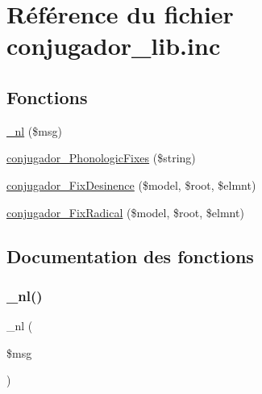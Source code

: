 \hypertarget{conjugador__lib_8inc}{}\section{Référence du fichier conjugador\+\_\+lib.\+inc}
\label{conjugador__lib_8inc}
\subsection*{Fonctions}
\begin{DoxyCompactItemize}
\item 
\hyperlink{conjugador__lib_8inc_af8d770de4c75689bba7f9764be4d6c80}{\+\_\+nl} (\$msg)
\item 
\hyperlink{conjugador__lib_8inc_a672ae0386cba05339c0708b743535c7a}{conjugador\+\_\+\+Phonologic\+Fixes} (\$string)
\item 
\hyperlink{conjugador__lib_8inc_a725ad05277ee35d68a3eb88b9b577ded}{conjugador\+\_\+\+Fix\+Desinence} (\$model, \$root, \$elmnt)
\item 
\hyperlink{conjugador__lib_8inc_a76b9b56f90098bda21fa8043ae7318ae}{conjugador\+\_\+\+Fix\+Radical} (\$model, \$root, \$elmnt)
\end{DoxyCompactItemize}


\subsection{Documentation des fonctions}
\hypertarget{conjugador__lib_8inc_af8d770de4c75689bba7f9764be4d6c80}{}\label{conjugador__lib_8inc_af8d770de4c75689bba7f9764be4d6c80} 
\subsubsection{\texorpdfstring{\+\_\+nl()}{\_nl()}}
{\footnotesize\ttfamily \+\_\+nl (\begin{DoxyParamCaption}\item[{}]{\$msg }\end{DoxyParamCaption})}

\hypertarget{conjugador__lib_8inc_a725ad05277ee35d68a3eb88b9b577ded}{}\label{conjugador__lib_8inc_a725ad05277ee35d68a3eb88b9b577ded} 

